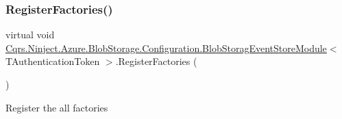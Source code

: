 \subsubsection{\texorpdfstring{Register\+Factories()}{RegisterFactories()}}
{\footnotesize\ttfamily virtual void \hyperlink{classCqrs_1_1Ninject_1_1Azure_1_1BlobStorage_1_1Configuration_1_1BlobStoragEventStoreModule}{Cqrs.\+Ninject.\+Azure.\+Blob\+Storage.\+Configuration.\+Blob\+Storag\+Event\+Store\+Module}$<$ T\+Authentication\+Token $>$.Register\+Factories (\begin{DoxyParamCaption}{ }\end{DoxyParamCaption})\hspace{0.3cm}{\ttfamily [virtual]}}



Register the all factories 

